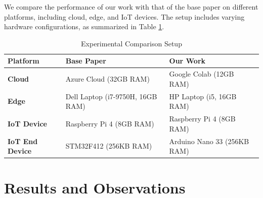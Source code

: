 \documentclass[conference,letterpaper]{IEEEtran}
\begin{document}
We compare the performance of our work with that of the base paper on different platforms, including cloud, edge, and IoT devices. The setup includes varying hardware configurations, as summarized in Table \ref{tab:experiment-comparison}.


\begin{table}[h!]
\renewcommand{\arraystretch}{1.0} %
\centering

\begin{tabular}
{|p{2.0cm}|p{2.6cm}|p{2.6cm}|}
\hline
\textbf{Platform} & \textbf{Base Paper \cite{basepaper2}} & \textbf{Our Work} \\
\hline
\textbf{Cloud} & Azure Cloud (32GB RAM) & Google Colab (12GB RAM) \\
\hline
\textbf{Edge} & Dell Laptop (i7-9750H, 16GB RAM) & HP Laptop (i5, 16GB RAM) \\
\hline
\textbf{IoT Device} & Raspberry Pi 4 (8GB RAM) & Raspberry Pi 4 (8GB RAM) \\
\hline
\textbf{IoT End Device} & STM32F412 (256KB RAM) & Arduino Nano 33 (256KB RAM) \\
\hline
\end{tabular}
\caption{Experimental Comparison Setup}
\label{tab:experiment-comparison}
\end{table}


\section{Results and Observations}
\end{document}

